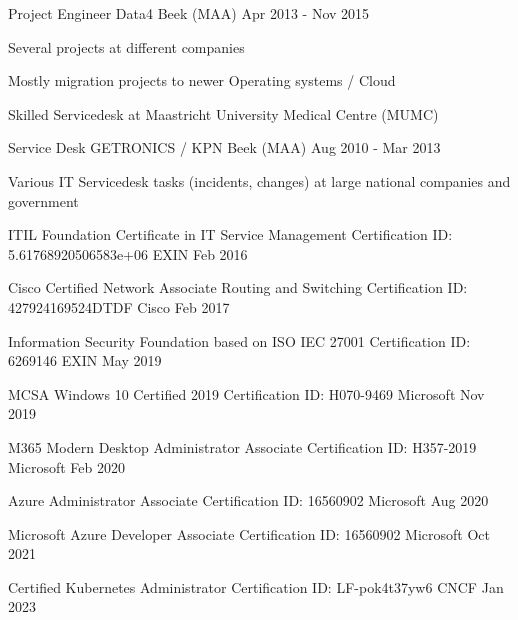\documentclass[11pt, letterpaper]{awesome-cv}
\begin{document}
\begin{cventries}
  \cventry
    {Project Engineer}
    {Data4}
    {Beek (MAA)}
    {Apr 2013 - Nov 2015}
    {
      \begin{cvitems}
        \item{Several projects at different companies}
        \item{Mostly migration projects to newer Operating systems / Cloud}
        \item{Skilled Servicedesk at Maastricht University Medical Centre (MUMC)}
      \end{cvitems}
    }


  \cventry
    {Service Desk}
    {GETRONICS / KPN}
    {Beek (MAA)}
    {Aug 2010 - Mar 2013}
    {
      \begin{cvitems}
        \item{Various IT Servicedesk tasks (incidents, changes) at large national companies and government}
      \end{cvitems}
    }



\end{cventries}

\begin{cvhonors}

  \cvhonor
    {ITIL Foundation Certificate in IT Service Management}
    {Certification ID: 5.61768920506583e+06}
    {EXIN}
    {Feb 2016}

  \cvhonor
    {Cisco Certified Network Associate Routing and Switching}
    {Certification ID: 427924169524DTDF}
    {Cisco}
    {Feb 2017}

  \cvhonor
    {Information Security Foundation based on ISO IEC 27001}
    {Certification ID: 6269146}
    {EXIN}
    {May 2019}

  \cvhonor
    {MCSA Windows 10 Certified 2019}
    {Certification ID: H070-9469}
    {Microsoft}
    {Nov 2019}

  \cvhonor
    {M365 Modern Desktop Administrator Associate}
    {Certification ID: H357-2019}
    {Microsoft}
    {Feb 2020}

  \cvhonor
    {Azure Administrator Associate}
    {Certification ID: 16560902}
    {Microsoft}
    {Aug 2020}

  \cvhonor
    {Microsoft Azure Developer Associate}
    {Certification ID: 16560902}
    {Microsoft}
    {Oct 2021}

  \cvhonor
    {Certified Kubernetes Administrator}
    {Certification ID: LF-pok4t37yw6}
    {CNCF}
    {Jan 2023}


\end{cvhonors}
\end{document}
